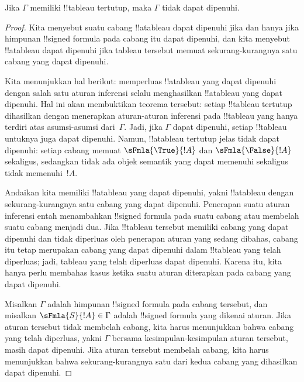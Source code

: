 \documentclass[../../../include/open-logic-section]{subfiles}
\begin{document}
\begin{thm}[Kesahihan]
  Jika $\Gamma$ memiliki !!{tableau} tertutup, maka $\Gamma$ tidak dapat
  dipenuhi.
\end{thm}

\begin{proof}
Kita menyebut suatu cabang !!a{tableau} dapat dipenuhi jika dan hanya
jika himpunan !!{signed formula} pada cabang itu dapat dipenuhi, dan kita
menyebut !!a{tableau} dapat dipenuhi jika tableau tersebut memuat
sekurang-kurangnya satu cabang yang dapat dipenuhi.

Kita menunjukkan hal berikut: memperluas !!a{tableau} yang dapat dipenuhi
dengan salah satu aturan inferensi selalu menghasilkan !!a{tableau} yang
dapat dipenuhi. Hal ini akan membuktikan teorema tersebut: setiap
!!{tableau} tertutup dihasilkan dengan menerapkan aturan-aturan inferensi
pada !!{tableau} yang hanya terdiri atas asumsi-asumsi dari~$\Gamma$.
Jadi, jika $\Gamma$ dapat dipenuhi, setiap !!{tableau} untuknya juga
dapat dipenuhi. Namun, !!a{tableau} tertutup jelas tidak dapat dipenuhi:
setiap cabang memuat $\sFmla{\True}{!A}$ dan $\sFmla{\False}{!A}$
sekaligus, sedangkan tidak ada objek semantik yang dapat memenuhi
sekaligus tidak memenuhi~$!A$.

Andaikan kita memiliki !!a{tableau} yang dapat dipenuhi, yakni
!!a{tableau} dengan sekurang-kurangnya satu cabang yang dapat dipenuhi.
Penerapan suatu aturan inferensi entah menambahkan !!{signed formula}
pada suatu cabang atau membelah suatu cabang menjadi dua. Jika
!!{tableau} tersebut memiliki cabang yang dapat dipenuhi dan tidak
diperluas oleh penerapan aturan yang sedang dibahas, cabang itu tetap
merupakan cabang yang dapat dipenuhi dalam !!{tableau} yang telah
diperluas; jadi, tableau yang telah diperluas dapat dipenuhi. Karena
itu, kita hanya perlu membahas kasus ketika suatu aturan diterapkan pada
cabang yang dapat dipenuhi.

Misalkan $\Gamma$ adalah himpunan !!{signed formula} pada cabang tersebut,
dan misalkan $\sFmla{S}{!A} \in \Gamma$ adalah !!{signed formula} yang
dikenai aturan. Jika aturan tersebut tidak membelah cabang, kita harus
menunjukkan bahwa cabang yang telah diperluas, yakni $\Gamma$ bersama
kesimpulan-kesimpulan aturan tersebut, masih dapat dipenuhi. Jika aturan
tersebut membelah cabang, kita harus menunjukkan bahwa sekurang-kurangnya
satu dari kedua cabang yang dihasilkan dapat dipenuhi.


\end{proof}
\end{document}
